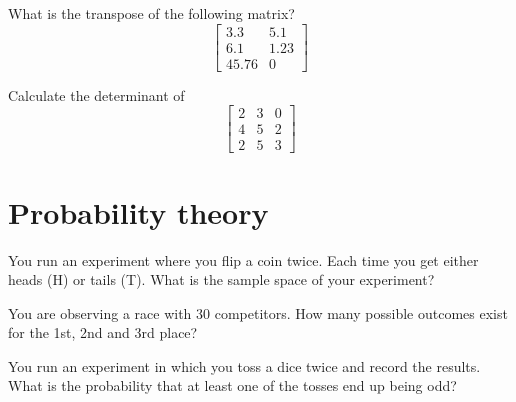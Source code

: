 \documentclass[10pt]{article}
\newenvironment{problem}[2][Problem]{\begin{trivlist}
\item[\hskip \labelsep {\bfseries #1}\hskip \labelsep {\bfseries #2.}]}{\end{trivlist}}
\begin{document}
\begin{problem}{4.3}
What is the transpose of the following matrix?
$$\begin{bmatrix}3.3 & 5.1 \\ 6.1 & 1.23 \\ 45.76 & 0\end{bmatrix}$$
\end{problem}

\begin{problem}{4.4}
Calculate the determinant of
$$\begin{bmatrix}2 & 3 & 0\\ 4 & 5 & 2 \\ 2 & 5 & 3\end{bmatrix} $$
\end{problem}

\section{Probability theory}

\begin{problem}{5.1}
You run an experiment where you flip a coin twice. Each time you get either heads (H) or tails (T). What is the sample space of your experiment?
\end{problem}

\begin{problem}{5.2}
You are observing a race with 30 competitors. How many possible outcomes exist for the 1st, 2nd and 3rd place?
\end{problem}

\begin{problem}{5.3}
You run an experiment in which you toss a dice twice and record the results. What is the probability that at least one of the tosses end up being odd?
\end{problem}
\end{document}
